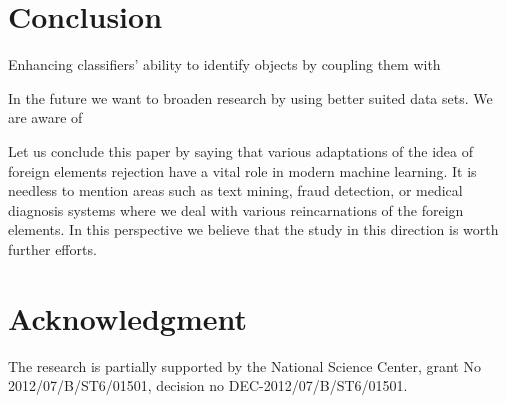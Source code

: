 \documentclass{llncs}
\begin{document}




\section{Conclusion}
  \label{sec:Conclusion}


Enhancing classifiers' ability to identify objects by coupling them with 

In the future we want to broaden research by using better suited data sets. We are aware of 

Let us conclude this paper by saying that various adaptations of the idea of foreign elements rejection have a vital role in modern machine learning. It is needless to mention areas such as text mining, fraud detection, or medical diagnosis systems where we deal with various reincarnations of the foreign elements. In this perspective we believe that the study in this direction is worth further efforts.


\section*{Acknowledgment}

\noindent The research is partially supported  by the National Science Center, grant No 2012/07/B/ST6/01501, decision no \mbox{DEC-2012/07/B/ST6/01501}.
\end{document}
